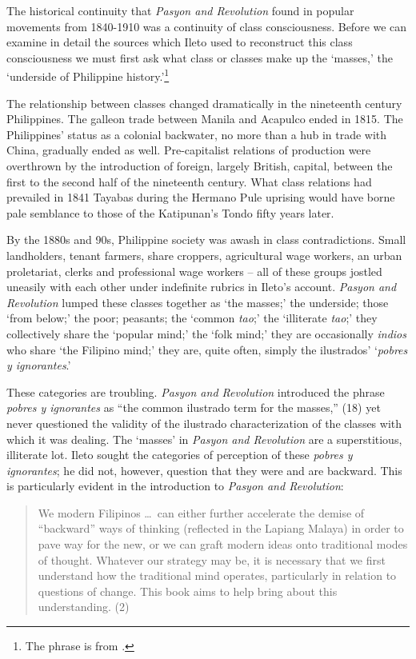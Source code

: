 The historical continuity that \textit{Pasyon and Revolution} found in popular movements from 1840-1910 was a continuity of class consciousness. Before we can examine in detail the sources which Ileto used to reconstruct this class consciousness we must first ask what class or classes make up the \enquote*{masses,} the \enquote*{underside of Philippine history.}\footnote{The phrase is from \cite{Ileto1982}.}

The relationship between classes changed dramatically in the nineteenth century Philippines. The galleon trade between Manila and Acapulco ended in 1815. The Philippines' status as a colonial backwater, no more than a hub in trade with China, gradually ended as well. Pre-capitalist relations of production were overthrown by the introduction of foreign, largely British, capital, between the first to the second half of the nineteenth century. What class relations had prevailed in 1841 Tayabas during the Hermano Pule uprising would have borne pale semblance to those of the Katipunan's Tondo fifty years later. 

By the 1880s and 90s, Philippine society was awash in class contradictions. Small landholders, tenant farmers, share croppers, agricultural wage workers, an urban proletariat, clerks and professional wage workers -- all of these groups jostled uneasily with each other under indefinite rubrics in Ileto's account. \textit{Pasyon and Revolution} lumped these classes together as \enquote*{the masses;} the underside; those \enquote*{from below;} the poor; peasants; the \enquote*{common \textit{tao};} the \enquote*{illiterate \textit{tao};} they collectively share the \enquote*{popular mind;} the \enquote*{folk mind;} they are occasionally \textit{indios} who share \enquote*{the Filipino mind;} they are, quite often, simply the ilustrados' \enquote*{\textit{pobres y ignorantes}.} 

These categories are troubling. \textit{Pasyon and Revolution} introduced the phrase \textit{pobres y ignorantes} as \enquote{the common ilustrado term for the masses,} (18) yet never questioned the validity of the ilustrado characterization of the classes with which it was dealing. The \enquote*{masses} in \textit{Pasyon and Revolution} are a superstitious, illiterate lot. Ileto sought the categories of perception of these \textit{pobres y ignorantes}; he did not, however, question that they were and are backward. This is particularly evident in the introduction to \textit{Pasyon and Revolution}:

\begin{quote}
We modern Filipinos \ldots\ can either further accelerate the demise of \enquote{backward} ways of thinking (reflected in the Lapiang Malaya) in order to pave way for the new, or we can graft modern ideas onto traditional modes of thought. Whatever our strategy may be, it is necessary that we first understand how the traditional mind operates, particularly in relation to questions of change. This book aims to help bring about this understanding. (2)
\end{quote}

